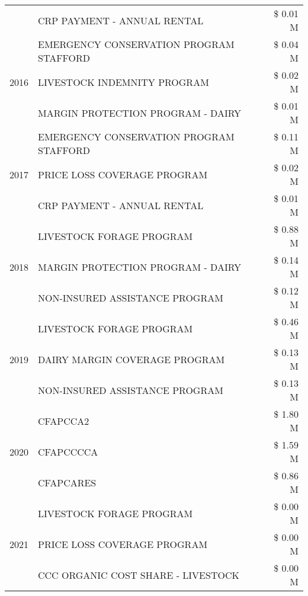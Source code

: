 \begin{tabular}{llr}
 & CRP PAYMENT - ANNUAL RENTAL & \$ 0.01 M \\
\cline{1-3}
\multirow[t]{3}{*}{2016} & EMERGENCY CONSERVATION PROGRAM STAFFORD & \$ 0.04 M \\
 & LIVESTOCK INDEMNITY PROGRAM & \$ 0.02 M \\
 & MARGIN PROTECTION PROGRAM - DAIRY & \$ 0.01 M \\
\cline{1-3}
\multirow[t]{3}{*}{2017} & EMERGENCY CONSERVATION PROGRAM STAFFORD & \$ 0.11 M \\
 & PRICE LOSS COVERAGE PROGRAM & \$ 0.02 M \\
 & CRP PAYMENT - ANNUAL RENTAL & \$ 0.01 M \\
\cline{1-3}
\multirow[t]{3}{*}{2018} & LIVESTOCK FORAGE PROGRAM & \$ 0.88 M \\
 & MARGIN PROTECTION PROGRAM - DAIRY & \$ 0.14 M \\
 & NON-INSURED ASSISTANCE PROGRAM & \$ 0.12 M \\
\cline{1-3}
\multirow[t]{3}{*}{2019} & LIVESTOCK FORAGE PROGRAM & \$ 0.46 M \\
 & DAIRY MARGIN COVERAGE PROGRAM & \$ 0.13 M \\
 & NON-INSURED ASSISTANCE PROGRAM & \$ 0.13 M \\
\cline{1-3}
\multirow[t]{3}{*}{2020} & CFAPCCA2 & \$ 1.80 M \\
 & CFAPCCCCA & \$ 1.59 M \\
 & CFAPCARES & \$ 0.86 M \\
\cline{1-3}
\multirow[t]{3}{*}{2021} & LIVESTOCK FORAGE PROGRAM & \$ 0.00 M \\
 & PRICE LOSS COVERAGE PROGRAM & \$ 0.00 M \\
 & CCC ORGANIC COST SHARE - LIVESTOCK & \$ 0.00 M \\
\cline{1-3}
\bottomrule
\end{tabular}
